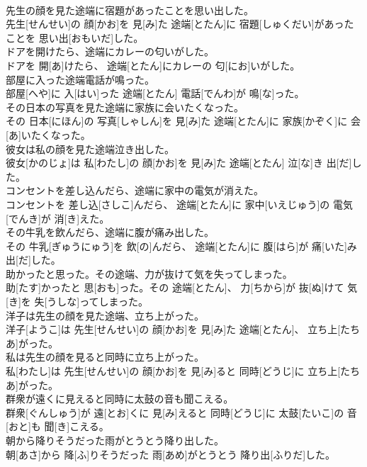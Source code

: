 \documentclass[8pt]{extreport}
\begin{document}
\begin{CJK}{UTF8}{min}
\\	先生の顔を見た途端に宿題があったことを思い出した。	
\\	先生[せんせい]の 顔[かお]を 見[み]た 途端[とたん]に 宿題[しゅくだい]があったことを 思い出[おもいだ]した。
\\	ドアを開けたら、途端にカレーの匂いがした。	
\\	ドアを 開[あ]けたら、 途端[とたん]にカレーの 匂[にお]いがした。
\\	部屋に入った途端電話が鳴った。	
\\	部屋[へや]に 入[はい]った 途端[とたん] 電話[でんわ]が 鳴[な]った。
\\	その日本の写真を見た途端に家族に会いたくなった。	
\\	その 日本[にほん]の 写真[しゃしん]を 見[み]た 途端[とたん]に 家族[かぞく]に 会[あ]いたくなった。
\\	彼女は私の顔を見た途端泣き出した。	
\\	彼女[かのじょ]は 私[わたし]の 顔[かお]を 見[み]た 途端[とたん] 泣[な]き 出[だ]した。
\\	コンセントを差し込んだら、途端に家中の電気が消えた。	
\\	コンセントを 差し込[さしこ]んだら、 途端[とたん]に 家中[いえじゅう]の 電気[でんき]が 消[き]えた。
\\	その牛乳を飲んだら、途端に腹が痛み出した。	
\\	その 牛乳[ぎゅうにゅう]を 飲[の]んだら、 途端[とたん]に 腹[はら]が 痛[いた]み 出[だ]した。
\\	助かったと思った。その途端、力が抜けて気を失ってしまった。	
\\	助[たす]かったと 思[おも]った。その 途端[とたん]、 力[ちから]が 抜[ぬ]けて 気[き]を 失[うしな]ってしまった。
\\	洋子は先生の顔を見た途端、立ち上がった。	
\\	洋子[ようこ]は 先生[せんせい]の 顔[かお]を 見[み]た 途端[とたん]、 立ち上[たちあ]がった。
\\	私は先生の顔を見ると同時に立ち上がった。	
\\	私[わたし]は 先生[せんせい]の 顔[かお]を 見[み]ると 同時[どうじ]に 立ち上[たちあ]がった。
\\	群衆が遠くに見えると同時に太鼓の音も聞こえる。	
\\	群衆[ぐんしゅう]が 遠[とお]くに 見[み]えると 同時[どうじ]に 太鼓[たいこ]の 音[おと]も 聞[き]こえる。
\\	朝から降りそうだった雨がとうとう降り出した。	
\\	朝[あさ]から 降[ふ]りそうだった 雨[あめ]がとうとう 降り出[ふりだ]した。

\end{CJK}
\end{document}
